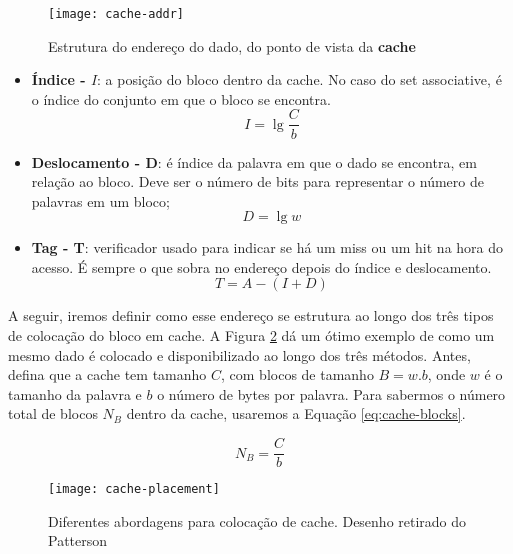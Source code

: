 \begin{figure}[ht]
  \centering
  \texttt{[image: cache-addr]}
  \caption{Estrutura do endereço do dado, do ponto de vista da \textbf{cache}}
  \label{fig:address-cache}
\end{figure}

\begin{itemize}
  \item \textbf{Índice - $I$}: a posição do bloco dentro da cache. No caso do set associative, é o índice do conjunto em que o bloco se encontra.
  \begin{equation}
    I = \lg{\frac{C}{b}}
  \end{equation}

  \item \textbf{Deslocamento - D}: é índice da palavra em que o dado se encontra, em relação ao bloco. Deve ser o número de bits para representar o número de palavras em um bloco;
  \begin{equation}
    D = \lg{w}
  \end{equation}

  \item \textbf{Tag - T}: verificador usado para indicar se há um miss ou um hit na hora do acesso. É sempre o que sobra no endereço depois do índice e deslocamento.
  \begin{equation}
    T = A - (I + D)
  \end{equation}
\end{itemize}

A seguir, iremos definir como esse endereço se estrutura ao longo dos três tipos de colocação do bloco em cache. A Figura \ref{fig:cache-placement} dá um ótimo exemplo de como um mesmo dado é colocado e disponibilizado ao longo dos três métodos. Antes, defina que a cache tem tamanho $C$, com blocos de tamanho $B = w.b$, onde $w$ é o tamanho da palavra e $b$ o número de bytes por palavra. Para sabermos o número total de blocos $N_B$ dentro da cache, usaremos a Equação \ref{eq:cache-blocks}.

\begin{equation}
N_B = \frac{C}{b}
\label{eq:cache-blocks}
\end{equation}

\begin{figure}[ht]
  \texttt{[image: cache-placement]}
  \caption{Diferentes abordagens para colocação de cache. Desenho retirado do Patterson}
  \label{fig:cache-placement}
\end{figure}



